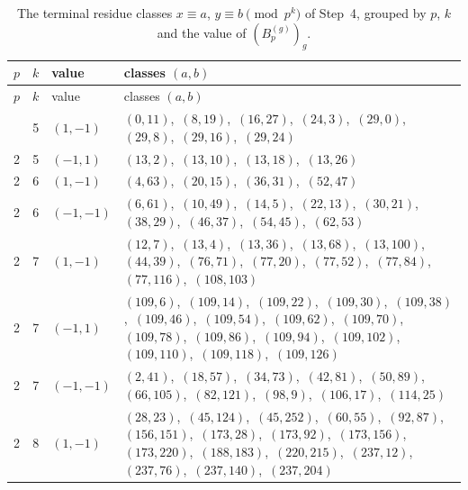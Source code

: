 \documentclass[11pt]{article}
\begin{document}
\begingroup\small
\setlength{\LTcapwidth}{\textwidth}
\begin{longtable}{@{}rrl>{\raggedright\arraybackslash}p{}@{}}
\caption{The terminal residue classes $x\equiv a$, $y\equiv b\pmod{p^k}$ of Step~4, grouped by $p$, $k$ and the value of $(B^{(g)}_p)_g$.}\label{tab:local}\\
\hline $p$ & $k$ & value & classes $(a,b)$\\\hline\endfirsthead
\hline $p$ & $k$ & value & classes $(a,b)$\\\hline\endhead\hline\endfoot
2 & 5 & $(1,-1)$ & $(0,11)$,\allowbreak\ $(8,19)$,\allowbreak\ $(16,27)$,\allowbreak\ $(24,3)$,\allowbreak\ $(29,0)$,\allowbreak\ $(29,8)$,\allowbreak\ $(29,16)$,\allowbreak\ $(29,24)$\\
2 & 5 & $(-1,1)$ & $(13,2)$,\allowbreak\ $(13,10)$,\allowbreak\ $(13,18)$,\allowbreak\ $(13,26)$\\
2 & 6 & $(1,-1)$ & $(4,63)$,\allowbreak\ $(20,15)$,\allowbreak\ $(36,31)$,\allowbreak\ $(52,47)$\\
2 & 6 & $(-1,-1)$ & $(6,61)$,\allowbreak\ $(10,49)$,\allowbreak\ $(14,5)$,\allowbreak\ $(22,13)$,\allowbreak\ $(30,21)$,\allowbreak\ $(38,29)$,\allowbreak\ $(46,37)$,\allowbreak\ $(54,45)$,\allowbreak\ $(62,53)$\\
2 & 7 & $(1,-1)$ & $(12,7)$,\allowbreak\ $(13,4)$,\allowbreak\ $(13,36)$,\allowbreak\ $(13,68)$,\allowbreak\ $(13,100)$,\allowbreak\ $(44,39)$,\allowbreak\ $(76,71)$,\allowbreak\ $(77,20)$,\allowbreak\ $(77,52)$,\allowbreak\ $(77,84)$,\allowbreak\ $(77,116)$,\allowbreak\ $(108,103)$\\
2 & 7 & $(-1,1)$ & $(109,6)$,\allowbreak\ $(109,14)$,\allowbreak\ $(109,22)$,\allowbreak\ $(109,30)$,\allowbreak\ $(109,38)$,\allowbreak\ $(109,46)$,\allowbreak\ $(109,54)$,\allowbreak\ $(109,62)$,\allowbreak\ $(109,70)$,\allowbreak\ $(109,78)$,\allowbreak\ $(109,86)$,\allowbreak\ $(109,94)$,\allowbreak\ $(109,102)$,\allowbreak\ $(109,110)$,\allowbreak\ $(109,118)$,\allowbreak\ $(109,126)$\\
2 & 7 & $(-1,-1)$ & $(2,41)$,\allowbreak\ $(18,57)$,\allowbreak\ $(34,73)$,\allowbreak\ $(42,81)$,\allowbreak\ $(50,89)$,\allowbreak\ $(66,105)$,\allowbreak\ $(82,121)$,\allowbreak\ $(98,9)$,\allowbreak\ $(106,17)$,\allowbreak\ $(114,25)$\\
2 & 8 & $(1,-1)$ & $(28,23)$,\allowbreak\ $(45,124)$,\allowbreak\ $(45,252)$,\allowbreak\ $(60,55)$,\allowbreak\ $(92,87)$,\allowbreak\ $(156,151)$,\allowbreak\ $(173,28)$,\allowbreak\ $(173,92)$,\allowbreak\ $(173,156)$,\allowbreak\ $(173,220)$,\allowbreak\ $(188,183)$,\allowbreak\ $(220,215)$,\allowbreak\ $(237,12)$,\allowbreak\ $(237,76)$,\allowbreak\ $(237,140)$,\allowbreak\ $(237,204)$\\

\end{longtable}
\end{document}
